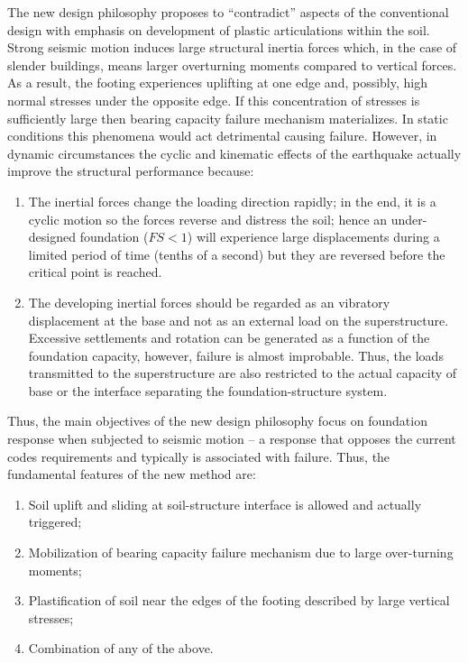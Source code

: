 \documentclass[12pt,a4paper]{report}
\begin{document}
The new design philosophy proposes to “contradict” aspects of the conventional design with emphasis on development of plastic articulations within the soil. Strong seismic motion induces large structural inertia forces which, in the case of slender buildings, means larger overturning moments compared to vertical forces. As a result, the footing experiences uplifting at one edge and, possibly, high normal stresses under the opposite edge. If this concentration of stresses is sufficiently large then bearing capacity failure mechanism materializes. In static conditions this phenomena would act detrimental causing failure. However, in dynamic circumstances the cyclic and kinematic effects of the earthquake actually improve the structural performance because:
\begin{enumerate}
	\item The inertial forces change the loading direction rapidly; in the end, it is a cyclic motion so the forces reverse and distress the soil; hence an under-designed foundation ($FS<1$) will experience large displacements during a limited period of time (tenths of a second) but they are reversed before the critical point is reached.
	\item The developing inertial forces should be regarded as an vibratory displacement at the base and not as an external load on the superstructure. Excessive settlements and rotation can be generated as a function of the foundation capacity, however, failure is almost improbable. Thus, the loads transmitted to the superstructure are also restricted to the actual capacity of base or the interface separating the foundation-structure system.
\end{enumerate}

Thus, the main objectives of the new design philosophy focus on foundation response when subjected to seismic motion – a response that opposes the current codes requirements and typically is associated with failure. Thus, the fundamental features of the new method are: 
\begin{enumerate}
	\item Soil uplift and sliding at soil-structure interface is allowed and actually triggered;
	\item Mobilization of bearing capacity failure mechanism due to large over-turning moments;
	\item Plastification of soil near the edges of the footing described by large vertical stresses; 
	\item Combination of any of the above.
\end{enumerate}
\end{document}
